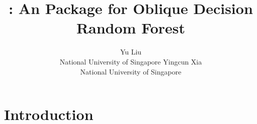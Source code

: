 \documentclass[nojss]{jss}
\author{Yu Liu\\National University of Singapore
   \And Yingcun Xia\\National University of Singapore}
\title{\pkg{ODRF}: An \proglang{R} Package for Oblique Decision Random Forest}
\numberwithin{equation}{section}
\begin{document}


\section{Introduction} \label{sec:intro}





\end{document}
